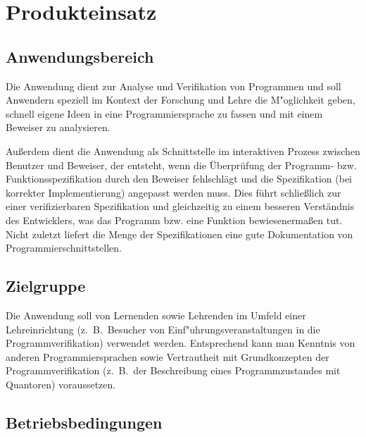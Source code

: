 \section{Produkteinsatz}%

\subsection{Anwendungsbereich}%

Die Anwendung dient zur Analyse und \see Verifikation von Programmen und soll Anwendern speziell im Kontext der Forschung und Lehre die M"oglichkeit geben, schnell eigene Ideen in eine Programmiersprache zu fassen und mit einem \see Beweiser zu analysieren.%

Außerdem dient die Anwendung als Schnittstelle im interaktiven Prozess zwischen Benutzer und Beweiser, der entsteht, wenn die Überprüfung der Programm- bzw. Funktionsspezifikation durch den Beweiser fehlschlägt und die Spezifikation (bei korrekter Implementierung) angepasst werden muss. Dies führt schließlich zur einer verifizierbaren Spezifikation und gleichzeitig zu einem besseren Verständnis des Entwicklers, was das Programm bzw. eine Funktion bewiesenermaßen tut. Nicht zuletzt liefert die Menge der Spezifikationen eine gute Dokumentation von Programmierschnittstellen.%

\subsection{Zielgruppe}%

Die Anwendung soll von Lernenden sowie Lehrenden im Umfeld einer Lehreinrichtung (z.~B.\ Besucher von Einf"uhrungsveranstaltungen in die Programmverifikation) verwendet werden. Entsprechend kann man Kenntnis von anderen Programmiersprachen sowie Vertrautheit mit Grundkonzepten der Programmverifikation (z.~B.\ der Beschreibung eines \see Programmzustandes mit \see Quantoren) voraussetzen.%

\subsection{Betriebsbedingungen}%

